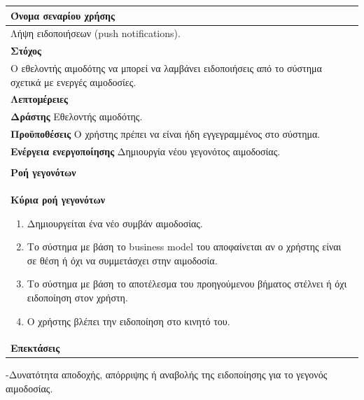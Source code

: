  \begin{center}
    \begin{tabular}{|p{\dimexpr \linewidth-2\tabcolsep}|}
    \hline
    \rowcolor{grayy}
    \textbf{Όνομα σεναρίου χρήσης}
    \\ \hline    
     Λήψη ειδοποιήσεων (push notifications).
     \\ \hline
    \rowcolor{grayy}
    \textbf{\textbf{Στόχος}}
    \\ \hline
 	 Ο εθελοντής αιμοδότης να μπορεί να λαμβάνει ειδοποιήσεις από το σύστημα σχετικά με ενεργές αιμοδοσίες. 
    \\ \hline
    \rowcolor{grayy}
    \textbf{Λεπτομέρειες}
    \\ \hline
	\textbf{Δράστης} Εθελοντής αιμοδότης.
	\\*
	\textbf{Προϋποθέσεις} Ο χρήστης πρέπει να είναι ήδη εγγεγραμμένος στο σύστημα.
	\\*
	\textbf{Ενέργεια ενεργοποίησης} Δημιουργία νέου γεγονότος αιμοδοσίας.
	\\ \hline
    \\ \hline
	\rowcolor{grayy}    
    \textbf{Ροή γεγονότων}
    \\* 
	\textbf{Κύρια ροή γεγονότων}
	\begin{enumerate}
	\item	Δημιουργείται ένα νέο συμβάν αιμοδοσίας.
	\item Το σύστημα με βάση το business model του αποφαίνεται αν ο χρήστης είναι σε θέση ή όχι να συμμετάσχει στην αιμοδοσία.
	\item Το σύστημα με βάση το αποτέλεσμα του προηγούμενου βήματος στέλνει ή όχι ειδοποίηση στον χρήστη.
	\item Ο χρήστης βλέπει την ειδοποίηση στο κινητό του.
	\end{enumerate}
	\\*
	\textbf{Επεκτάσεις}
	   \\ \hline
    \end{tabular}
\end{center}

-Δυνατότητα αποδοχής, απόρριψης ή αναβολής της ειδοποίησης για το γεγονός αιμοδοσίας.

